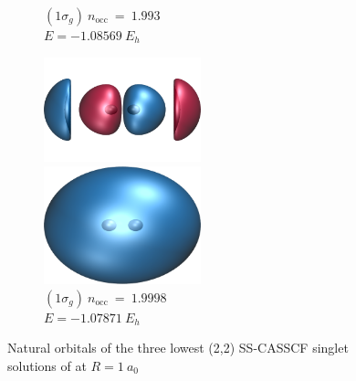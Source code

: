 \documentclass[aps,prb,reprint,showkeys,superscriptaddress]{revtex4-1}
\begin{document}
\begin{figure}
\begin{subfigure}[b]{0.31\textwidth}
    \caption*{\centering $(1\sigma_g)~n_\text{occ}~=~1.993$ \protect\\ $E=-1.08569~E_h$}
  \end{subfigure}
  \begin{subfigure}[b]{0.31\textwidth}
    \includegraphics[width=0.5\textwidth]{Figures/h2_HF_mo4.cube.png}
    \caption*{\centering $(2\sigma_u)~n_\text{occ}~=~0.0002$}
    \includegraphics[width=0.5\textwidth]{Figures/h2_HF_mo1.cube.png}
    \caption*{\centering $(1\sigma_g)~n_\text{occ}~=~1.9998$ \protect\\ $E=-1.07871~E_h$}
  \end{subfigure}
  \caption{Natural orbitals of the three lowest (2,2) SS-CASSCF singlet solutions of  at $R=1~a_0$ \label{fig:fig_4}}
\end{figure}
\end{document}
